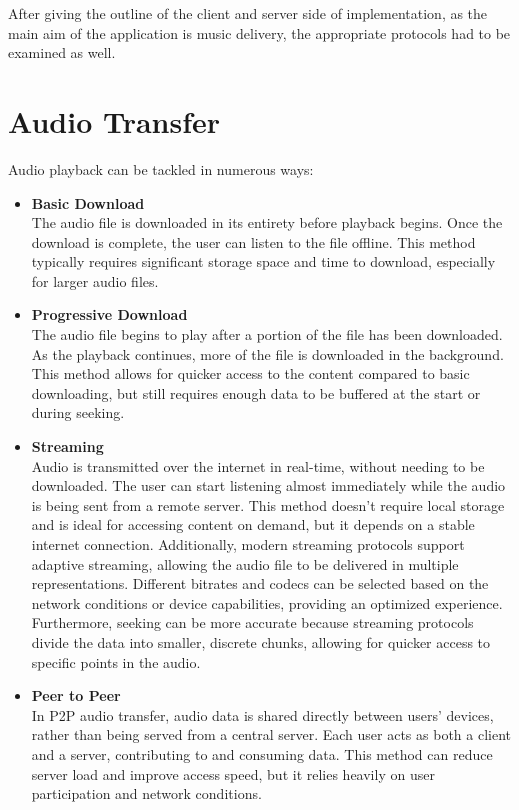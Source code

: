 After giving the outline of the client and server side of implementation,
as the main aim of the application is music delivery, the appropriate protocols had to be examined as well.


\section{Audio Transfer}
Audio playback can be tackled in numerous ways:

\begin{itemize}
    \item \textbf{Basic Download}\\
    The audio file is downloaded in its entirety before playback begins.
    Once the download is complete, the user can listen to the file offline.
    This method typically requires significant storage space and time to download,
    especially for larger audio files.

    \item \textbf{Progressive Download}\\
    The audio file begins to play after a portion of the file
    has been downloaded. As the playback continues, more of the file is downloaded
    in the background. This method allows for quicker access to the content
    compared to basic downloading, but still requires enough data to be buffered at the start or during seeking.

    \item \textbf{Streaming}\\
    Audio is transmitted over the internet in real-time, without needing
    to be downloaded. The user can start listening almost immediately while the audio is being
    sent from a remote server. This method doesn’t require local storage and is
    ideal for accessing content on demand, but it depends on a stable internet connection.
    Additionally, modern streaming protocols support adaptive streaming, allowing the audio file
    to be delivered in multiple representations. Different bitrates and codecs can be
    selected based on the network conditions or device capabilities, providing an optimized experience.
    Furthermore, seeking can be more accurate because streaming protocols divide the data into
    smaller, discrete chunks, allowing for quicker access to specific points in the audio.

    \item \textbf{Peer to Peer}\\
    In P2P audio transfer, audio data is shared directly between users'
    devices, rather than being served from a central server.
    Each user acts as both a client and a server, contributing to and consuming
    data. This method can reduce server load and improve access speed,
    but it relies heavily on user participation and network conditions.
\end{itemize}

